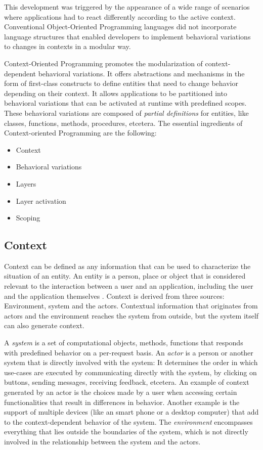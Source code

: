 \documentclass{acm_proc_article-sp}
\begin{document}
This development was triggered by the appearance of a wide range of scenarios where applications had to react differently according to the active context. Conventional Object-Oriented Programming languages did not incorporate language structures that enabled developers to implement behavioral variations to changes in contexts in a modular way. 

Context-Oriented Programming promotes the modularization of context-dependent behavioral variations. It offers abstractions and mechanisms in the form of first-class constructs to define entities that need to change behavior depending on their context. It allows applications to be partitioned into behavioral variations that can be activated at runtime with predefined scopes. These behavioral variations are composed of \textit{partial definitions} for entities, like classes, functions, methods, procedures, etcetera. The essential ingredients of Context-oriented Programming \cite{Costanza:2008:CPC:1529966.1529970} are the following:

\begin{itemize}
\item {Context}
\item Behavioral variations
\item Layers
\item Layer activation
\item Scoping
\end{itemize}

\subsection{Context}
\label{sec:context}
Context can be defined as any information that can be used to characterize the situation of an entity. An entity is a person, place or object that is considered relevant to the interaction between a user and an application, including the user and the application themselves \cite{Abowd:1999:TBU:647985.743843}. Context is derived from three sources: Environment, system and the actors. Contextual information that originates from actors and the environment reaches the system from outside, but the system itself can also generate context. 

A \textit{system} is a set of computational objects, methods, functions that responds with predefined behavior on a per-request basis. An \textit{actor} is a person or another system that is directly involved with the system: It determines the order in which use-cases are executed by communicating directly with the system, by clicking on buttons, sending messages, receiving feedback, etcetera. An example of context generated by an actor is the choices made by a user when accessing certain functionalities that result in differences in behavior. Another example is the support of multiple devices (like an smart phone or a desktop computer) that add to the context-dependent behavior of the system. The \textit{environment} encompasses everything that lies outside the boundaries of the system, which is not directly involved in the relationship between the system and the actors.
\end{document}
